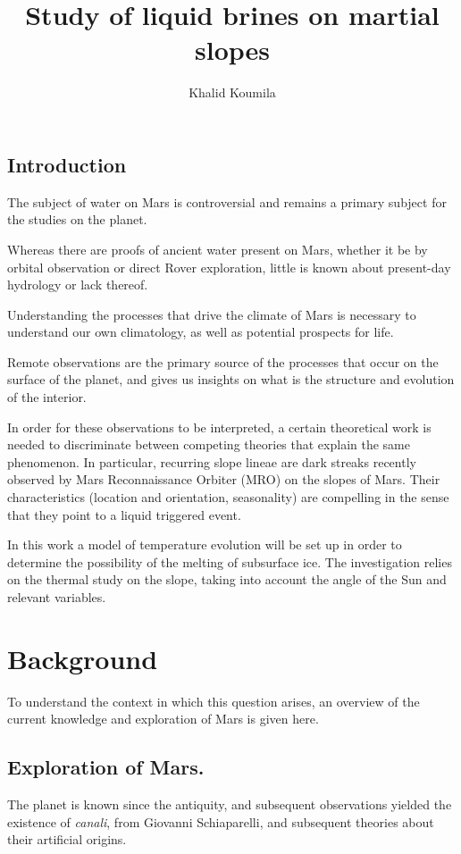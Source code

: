 \documentclass{report}
\title{Study of liquid brines on martial slopes}
\author{Khalid Koumila}
\date{}
\begin{document}
\maketitle
\tableofcontents 

\newpage
\section*{Introduction}
The subject of water on Mars is controversial and remains a primary subject for the studies on the planet. 

Whereas there are proofs of ancient water present on Mars, whether it be by orbital observation or direct Rover exploration, little is known about present-day hydrology or lack thereof. 

Understanding the processes that drive the climate of Mars is necessary to understand our own climatology, as well as potential prospects for life.

Remote observations are the primary source of the processes that occur on the surface of the planet, and gives us insights on what is the structure and evolution of the interior.

In order for these observations to be interpreted, a certain theoretical work is needed to discriminate between competing theories that explain the same phenomenon.
In particular, recurring slope lineae are dark streaks recently observed by Mars Reconnaissance Orbiter (MRO) on the slopes of Mars. Their characteristics (location and orientation, seasonality) are compelling in the sense that they point to a liquid triggered event. 

In this work a model of temperature evolution will be set up in order to determine the possibility of the melting of subsurface ice. The investigation relies on the thermal study on the slope, taking into account the angle of the Sun and relevant variables.

\chapter{Background}
To understand the context in which this question arises, an overview of the current knowledge and exploration of Mars is given here.
\section{Exploration of Mars.} 
The planet is known since the antiquity, and subsequent observations yielded the existence of \textit{canali}, from Giovanni Schiaparelli, and subsequent theories about their artificial origins.
\end{document}
